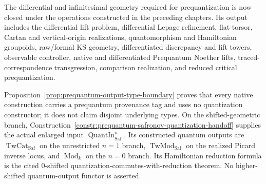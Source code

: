 The differential and infinitesimal geometry required for prequantization is now
closed under the operations constructed in the preceding chapters.  Its output
includes the differential lift problem, differential Lepage refinement, flat
torsor, Cartan and vertical-origin realizations, quantomorphism and Hamiltonian
groupoids, raw/formal KS geometry, differentiated discrepancy and lift towers,
observable controller, native and differentiated Prequantum Noether lifts,
traced-correspondence transgression, comparison realization, and reduced critical
prequantization.

Proposition~\ref{prop:prequantum-output-type-boundary} proves that every native
construction carries a prequantum provenance tag and uses no quantization
constructor; it does not claim disjoint underlying types.  On the
shifted-geometric branch,
Construction~\ref{constr:prequantum-safronov-quantization-handoff} supplies the
actual enlarged input $\operatorname{QuantIn}_{\mathrm{Saf}}^n$.  Its constructed
quantum outputs are $\operatorname{TwCat}_{\mathrm{Saf}}$ on the unrestricted
$n=1$ branch,
$\operatorname{TwMod}_{\mathrm{Saf}}$ on the realized Picard inverse locus, and
$\operatorname{Mod}_k$ on the $n=0$ branch.  Its Hamiltonian reduction formula
is the cited $0$-shifted quantization-commutes-with-reduction theorem.  No
higher-shifted quantum-output functor is asserted.
